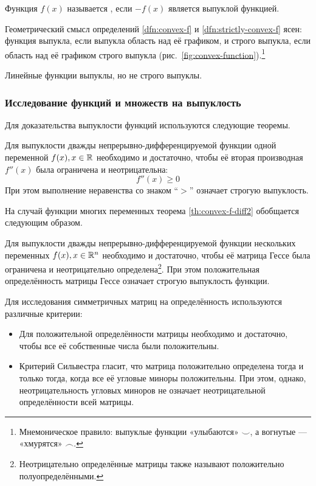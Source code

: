 \begin{dfn}
  \label{dfn:concave}
  Функция $f(x)$ называется , если $-f(x)$ является
  выпуклой функцией.
\end{dfn}

Геометрический смысл определений \ref{dfn:convex-f} и
\ref{dfn:strictly-convex-f} ясен: функция выпукла, если выпукла
область над её графиком, и строго выпукла, если область над её
графиком строго выпукла
(рис. \ref{fig:convex-function}).\footnote{Мнемоническое правило:
  выпуклые функции «улыбаются» $\smile$, а вогнутые
  — «хмурятся» $\frown$.}



\begin{rem}
  \label{rem:lin-f-convex}
  Линейные функции выпуклы, но не строго выпуклы.
\end{rem}

\subsubsection{Исследование функций и множеств на выпуклость}
\label{sec:convex-analysis}
Для доказательства выпуклости функций используются следующие теоремы.

\begin{thm}
  \label{th:convex-f-diff2}
  Для выпуклости дважды непрерывно-дифференцируемой функции одной
  переменной $f(x), x \in \mathbb{R}$ необходимо и достаточно, чтобы её
  вторая производная $f''(x)$ была ограничена и неотрицательна:
  \begin{equation*}
    f''(x) \geq 0
  \end{equation*}
  При этом выполнение неравенства со знаком {\rm``$>$''\/}\! означает
  строгую выпуклость.
\end{thm}

На случай функции многих переменных теорема \ref{th:convex-f-diff2}
обобщается следующим образом.
\begin{thm}
  \label{th:convex-f-hess}
  Для выпуклости дважды непрерывно-дифференцируемой функции нескольких
  переменных $f(x), x \in \mathbb{R}^n$ необходимо и достаточно, чтобы её
  матрица Гессе была ограничена и неотрицательно
  определена\footnote{Неотрицательно определённые матрицы также
    называют положительно полуопределёнными.}. При этом положительная
  определённость матрицы Гессе означает строгую выпуклость функции.
\end{thm}

Для исследования симметричных матриц на определённость используются
различные критерии:
\begin{itemize}
\item Для положительной определённости матрицы необходимо и
  достаточно, чтобы все её собственные числа были положительны.
\item Критерий Сильвестра гласит, что матрица положительно определена
  тогда и только тогда, когда все её угловые миноры положительны. При
  этом, однако, неотрицательность угловых миноров не означает
  неотрицательной определённости всей матрицы.
\end{itemize}

